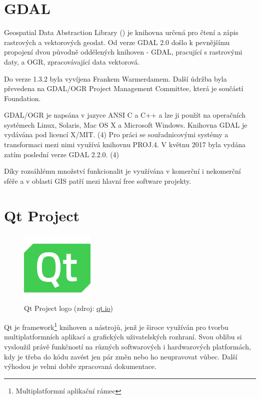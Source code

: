   
\section{GDAL}

Geospatial Data Abstraction Library () je knihovna určená pro
čtení a zápis rastrových a vektorových geodat. Od verze GDAL 2.0 došlo
k pevnějšímu propojení dvou původně oddělených knihoven - GDAL,
pracující s rastrovými daty, a OGR, zpracovávající data vektorová.

Do verze 1.3.2 byla vyvíjena Frankem Warmerdamem. Další údržba byla
převedena na GDAL/OGR Project Management Committee, která je součástí
 Foundation.

GDAL/OGR je napsána v jazyce ANSI C a C++ a lze ji použít na
operačních systémech Linux, Solaris, Mac OS X a Microsoft
Windows. Knihovna GDAL je vydávána pod licencí X/MIT. (4) Pro práci se
souřadnicovými systémy a transformaci mezi nimi využívá knihovnu
PROJ.4. V květnu 2017 byla vydána zatím poslední verze GDAL 2.2.0. (4)

Díky rozsáhlému množství funkcionalit je využívána v komerční i
nekomerční sféře a v oblasti GIS patří mezi hlavní free software
projekty.


\section{Qt Project}

\begin{figure}[H] \centering
      \includegraphics[width=100pt]{./pictures/qt_logo_green_256x256px.png}
      \caption[Qt Project logo]{Qt Project logo (zdroj:
\href{http://brand.qt.io/downloads/}{qt.io})}
      \label{fig:qt}
  \end{figure}

Qt je framework\footnote{Multiplatformní aplikační rámec} knihoven a
nástrojů, jenž je široce využíván pro tvorbu multiplatformních
aplikací a grafických uživatelských rozhraní. Svou oblibu si vysloužil
právě funkčností na různých softwarových i hardwarových platformách,
kdy je třeba do kódu zavést jen pár změn nebo ho neupravovat
vůbec. Další výhodou je velmi dobře zpracovaná dokumentace.

